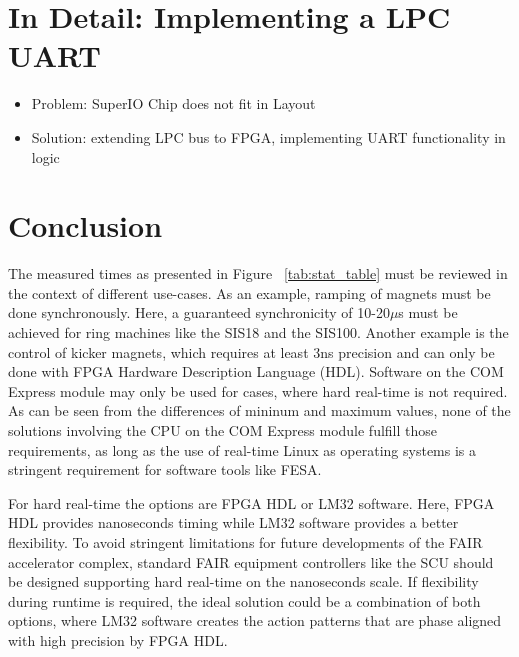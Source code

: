 \documentclass[25pt,halfparskip-,pagesize]{scrartcl}
\begin{document}
\begin{multicols*}{3}
\section{In Detail: Implementing a LPC UART}
\begin{itemize}
	\item Problem: SuperIO Chip does not fit in Layout
	\item Solution: extending LPC bus to FPGA, implementing UART functionality in logic
\end{itemize}


\section{Conclusion}
The measured times as presented in Figure ~\ref{tab:stat_table}
must be reviewed in the context of different use-cases. As an example,
ramping of magnets must be done synchronously. Here, a guaranteed
synchronicity of 10-20$\mu$s must be achieved for ring machines like the
SIS18 and the SIS100. Another example is the control of kicker magnets,
which requires  at least 3ns precision and can only be done with FPGA
Hardware Description Language (HDL). Software on the COM Express module
may only be used for cases, where hard real-time is not required.
As can be seen from the differences of mininum and maximum values, none
of the solutions involving the CPU on the COM Express module fulfill
those requirements, as long as the use of real-time Linux as operating
systems is a stringent requirement for software tools like FESA.

For hard real-time the options are FPGA HDL or LM32 software. Here, FPGA
HDL provides nanoseconds timing while LM32 software provides a better
flexibility. To avoid stringent limitations for future developments of
the FAIR accelerator complex, standard FAIR equipment controllers like
the SCU should be designed supporting hard real-time on the nanoseconds
scale. If flexibility during runtime is required, the ideal solution
could be a combination of both options, where LM32 software creates the
action patterns that are phase aligned with high precision by FPGA HDL.


\vfill

\end{multicols*}
\end{document}
